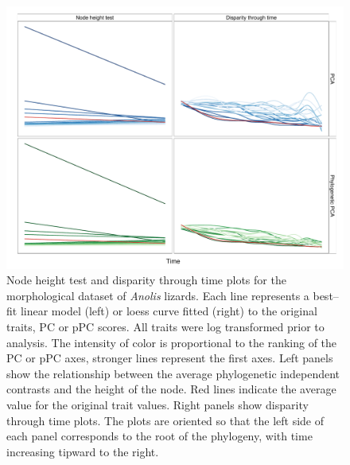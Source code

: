 \documentclass[12pt,twoside]{article}
\begin{document}
\begin{figure}[p]
\centering
\includegraphics[scale=0.65]{./fig/anoles_nh-dtt.pdf}
\caption[Node height test and disparity through time on the \emph{Anolis} dataset]{Node height test and disparity through time plots for the morphological dataset of \textit{Anolis} lizards. Each line represents a best--fit linear model (left) or loess curve fitted (right) to the original traits, PC or pPC scores. All traits were log transformed prior to analysis. The intensity of color is proportional to the ranking of the PC or pPC axes, stronger lines represent the first axes. Left panels show the relationship between the average phylogenetic independent contrasts and the height of the node. Red lines indicate the average value for the original trait values. Right panels show disparity through time plots. The plots are oriented so that the left side of each panel corresponds to the root of the phylogeny, with time increasing tipward to the right. }
\label{anoles_nh}
\end{figure}


\clearpage


\end{document}
